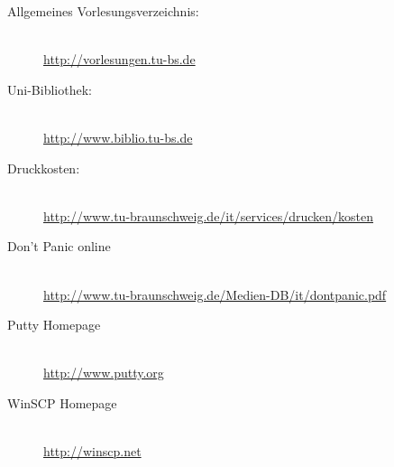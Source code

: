 \begin{description}
\item[Allgemeines Vorlesungsverzeichnis:] ~\\
{\footnotesize\url{http://vorlesungen.tu-bs.de}}
\item[Uni-Bibliothek:] ~\\
{\footnotesize\url{http://www.biblio.tu-bs.de}}
\item[Druckkosten:] ~\\
{\footnotesize\url{http://www.tu-braunschweig.de/it/services/drucken/kosten}}
\item[Don't Panic online] ~\\
{\footnotesize\url{http://www.tu-braunschweig.de/Medien-DB/it/dontpanic.pdf}}
\item[Putty Homepage] ~\\
{\footnotesize\url{http://www.putty.org}}
\item[WinSCP Homepage] ~\\
{\footnotesize\url{http://winscp.net}}
\end{description}
